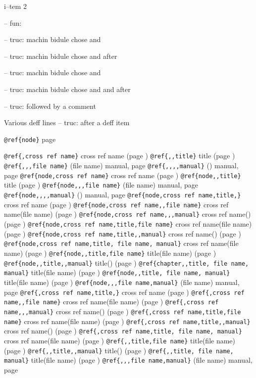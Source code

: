 \documentclass{book}
\begin{document}
i--tem 2

\hbox{}-- fun: 


\hbox{}-- truc: machin bidule chose and


\hbox{}-- truc: machin bidule chose and  after


\hbox{}-- truc: machin bidule chose and 


\hbox{}-- truc: machin bidule chose and and after


\hbox{}-- truc: followed by a comment


Various deff lines
\hbox{}-- truc: after a deff item



\texttt{@ref\{node\}} page \pageref{anchor:node}

\texttt{@ref\{,cross ref name\}} cross ref name (page \pageref{anchor:})
\texttt{@ref\{,,title\}} title (page \pageref{anchor:})
\texttt{@ref\{,,,file name\}} (file name) manual, page \pageref{anchor:}
\texttt{@ref\{,,,,manual\}} () manual, page \pageref{anchor:}
\texttt{@ref\{node,cross ref name\}} cross ref name (page \pageref{anchor:node})
\texttt{@ref\{node,,title\}} title (page \pageref{anchor:node})
\texttt{@ref\{node,,,file name\}} (file name) manual, page \pageref{anchor:node}
\texttt{@ref\{node,,,,manual\}} () manual, page \pageref{anchor:node}
\texttt{@ref\{node,cross ref name,title,\}} cross ref name (page \pageref{anchor:node})
\texttt{@ref\{node,cross ref name,,file name\}} cross ref name(file name) (page \pageref{anchor:node})
\texttt{@ref\{node,cross ref name,,,manual\}} cross ref name() (page \pageref{anchor:node})
\texttt{@ref\{node,cross ref name,title,file name\}} cross ref name(file name) (page \pageref{anchor:node})
\texttt{@ref\{node,cross ref name,title,,manual\}} cross ref name() (page \pageref{anchor:node})
\texttt{@ref\{node,cross ref name,title, file name, manual\}} cross ref name(file name) (page \pageref{anchor:node})
\texttt{@ref\{node,,title,file name\}} title(file name) (page \pageref{anchor:node})
\texttt{@ref\{node,,title,,manual\}} title() (page \pageref{anchor:node})
\texttt{@ref\{chapter,,title, file name, manual\}} title(file name) (page \pageref{anchor:chapter})
\texttt{@ref\{node,,title, file name, manual\}} title(file name) (page \pageref{anchor:node})
\texttt{@ref\{node,,,file name,manual\}} (file name) manual, page \pageref{anchor:node}
\texttt{@ref\{,cross ref name,title,\}} cross ref name (page \pageref{anchor:})
\texttt{@ref\{,cross ref name,,file name\}} cross ref name(file name) (page \pageref{anchor:})
\texttt{@ref\{,cross ref name,,,manual\}} cross ref name() (page \pageref{anchor:})
\texttt{@ref\{,cross ref name,title,file name\}} cross ref name(file name) (page \pageref{anchor:})
\texttt{@ref\{,cross ref name,title,,manual\}} cross ref name() (page \pageref{anchor:})
\texttt{@ref\{,cross ref name,title, file name, manual\}} cross ref name(file name) (page \pageref{anchor:})
\texttt{@ref\{,,title,file name\}} title(file name) (page \pageref{anchor:})
\texttt{@ref\{,,title,,manual\}} title() (page \pageref{anchor:})
\texttt{@ref\{,,title, file name, manual\}} title(file name) (page \pageref{anchor:})
\texttt{@ref\{,,,file name,manual\}} (file name) manual, page \pageref{anchor:}
\end{document}
